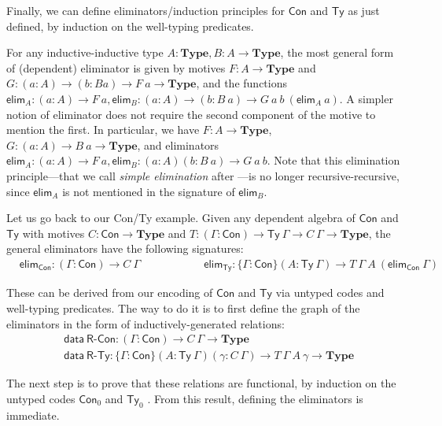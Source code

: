 \documentclass[a4paper,UKenglish,cleveref, autoref, thm-restate]{lipics-v2019}
\newcommand{\GG}{\Gamma}
\newcommand{\mType}{\mathbf{Type}}
\begin{document}
Finally, we can define eliminators/induction principles for $\textsf{Con}$ and
$\textsf{Ty}$ as just defined, by induction on the well-typing predicates.

For any inductive-inductive type $A : \mType, B: A \to \mType$, the most general
form of (dependent) eliminator is given by motives $F : A \to \mType$ and $G :
(a : A) \to (b : B a) \to F\ a \to \mType$, and the functions $\textsf{elim}_A :
(a : A) \to F\ a, \textsf{elim}_B : (a : A) \to (b : B\ a) \to
G\ a\ b\ (\textsf{elim}_A\ a)$. A simpler notion of eliminator does not require
the second component of the motive to mention the first. In particular, we have
$F : A \to \mType$, $G : (a : A) \to B\ a \to \mType$, and eliminators
$\textsf{elim}_A : (a : A) \to F\ a, \textsf{elim}_B : (a : A) (b : B\ a) \to
G\ a\ b$. Note that this elimination principle---that we call \emph{simple
  elimination} after \cite{ii}---is no longer recursive-recursive, since
$\textsf{elim}_A$ is not mentioned in the signature of $\textsf{elim}_B$.

Let us go back to our \textsf{Con}/\textsf{Ty} example. Given any dependent
algebra of $\textsf{Con}$ and $\textsf{Ty}$ with motives $C : \textsf{Con} \to
\mType$ and $T : (\GG : \textsf{Con}) \to \textsf{Ty}\ \GG \to C\ \GG \to
\mType$, the general eliminators have the following signatures:
\begin{align*}
  & \textsf{elim}_{\textsf{Con}} : (\GG : \textsf{Con}) \to C\ \GG \hspace{5em} & \textsf{elim}_{\textsf{Ty}} : \{\GG : \textsf{Con}\} (A : \textsf{Ty}\ \GG) \to T\ \GG\ A\ (\textsf{elim}_{\textsf{Con}}\ \GG)
\end{align*}

These can be derived from our encoding of $\textsf{Con}$ and $\textsf{Ty}$ via
untyped codes and well-typing predicates. The way to do it is to first define
the graph of the eliminators in the form of inductively-generated relations:
\begin{align*}
  & \textsf{data}\ \textsf{R-Con} :
    (\GG : \textsf{Con}) \to C\ \GG \to \mType \\
  & \textsf{data}\ \textsf{R-Ty} : \{\GG : \textsf{Con}\} (A : \textsf{Ty}\ \GG)
  (\gamma : C\ \GG)
  \to T\ \GG\ A\ \gamma
  \to \mType
\end{align*}

The next step is to prove that these relations are functional, by induction on
the untyped codes $\textsf{Con}_0$ and $\textsf{Ty}_0$ \cite{induction-is-enough}. From this result,
defining the eliminators is immediate.
\end{document}
